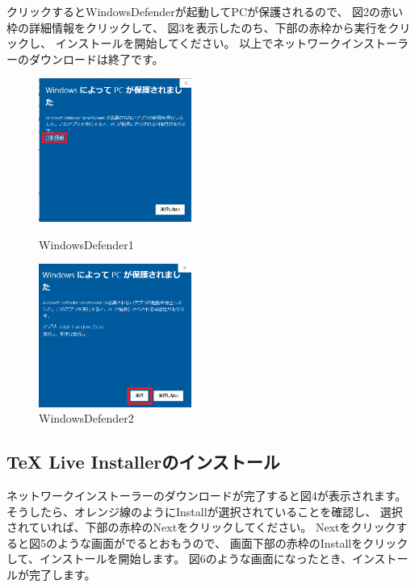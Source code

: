 \documentclass[dvipdfmx]{jsarticle}
\begin{document}
クリックするとWindowsDefenderが起動してPCが保護されるので、
図2の赤い枠の詳細情報をクリックして、
図3を表示したのち、下部の赤枠から実行をクリックし、
インストールを開始してください。
以上でネットワークインストーラーのダウンロードは終了です。

\begin{figure}[H]
    \begin{minipage}[b]{0.45\linewidth}
        \centering
        \includegraphics[width=5cm]{images/WindowsDefender1.png}
        \caption{WindowsDefender1}
    \end{minipage}
    \begin{minipage}[b]{0.45\linewidth}
        \centering
        \includegraphics[width=5cm]{images/WindowsDefender2.png}
        \caption{WindowsDefender2}
    \end{minipage}
\end{figure}

\subsection{TeX Live Installerのインストール}

ネットワークインストーラーのダウンロードが完了すると図4が表示されます。
そうしたら、オレンジ線のようにInstallが選択されていることを確認し、
選択されていれば、下部の赤枠のNextをクリックしてください。
Nextをクリックすると図5のような画面がでるとおもうので、
画面下部の赤枠のInstallをクリックして、インストールを開始します。
図6のような画面になったとき、インストールが完了します。
\end{document}
